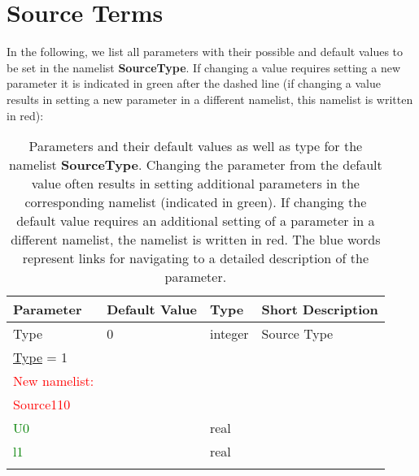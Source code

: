 \documentclass[12pt,twoside]{article}
\begin{document}
\newpage

\section{Source Terms}
\label{sec-block-src}

In the following, we list all parameters with their possible and default values to be set in the namelist \textbf{SourceType}.
If changing a value requires setting a new
parameter it is indicated in green after the dashed line (if changing a value results in setting a new
parameter in a different namelist, this namelist is written in red):\\

\begin{table}[H]
\caption{Parameters and their default values as well as type for the namelist \textbf{SourceType}.
         Changing the parameter from the default value often results in setting additional parameters in the corresponding namelist (indicated in green).
         If changing the default value requires an additional setting of a parameter in a different namelist, the namelist is written in red. The blue words represent
         links for navigating to a detailed description of the parameter.}
\begin{center}
\begin{tabular}{|p{4cm}|p{2.7cm}|p{2cm}|p{4cm}|}
\hline
Parameter & Default Value & Type & Short Description \\
\hline
\hline
Type & 0 & integer & Source Type\\
\hdashline
\uline{Type} = 1 & & &\\
\textcolor{red}{New namelist:} & & &\\
\textcolor{red}{Source110} & & &\\
\textcolor{green}{U0} &  & real & \\
\textcolor{green}{l1} &  & real & \\
\hdashline

\end{tabular}
\end{center}
\end{table}
\end{document}
